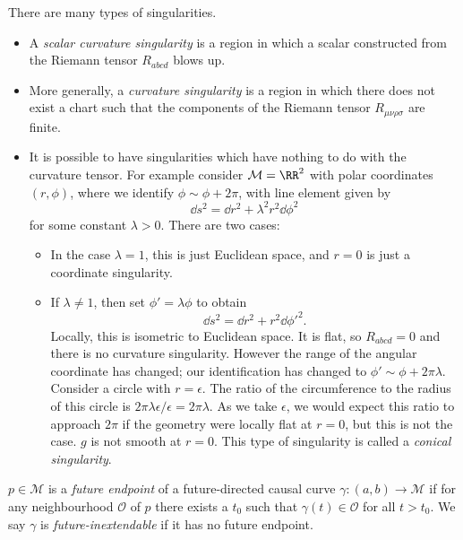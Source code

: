 \documentclass{jknotes}
\begin{document}
There are many types of singularities.
\begin{itemize}
    \item A \emph{scalar curvature singularity} is a region in which a scalar constructed from the Riemann tensor \(R_{abcd}\) blows up.
    \item More generally, a \emph{curvature singularity} is a region in which there does not exist a chart such that the components of the Riemann tensor \(R_{\mu\nu\rho\sigma}\) are finite.
    \item It is possible to have singularities which have nothing to do with the curvature tensor. For example consider \(\mathcal{M}=\RR^2\) with polar coordinates \((r,\phi)\), where we identify \(\phi \sim \phi+2\pi\), with line element given by
        \begin{equation}
            \dd{s}^2=\dd{r}^2+\lambda^2r^2\dd{\phi}^2
        \end{equation}
        for some constant \(\lambda>0\). There are two cases:
        \begin{itemize}
            \item In the case \(\lambda=1\), this is just Euclidean space, and \(r=0\) is just a coordinate singularity.
            \item If \(\lambda\ne1\), then set \(\phi'=\lambda\phi\) to obtain
                \begin{equation}
                    \dd{s}^2 = \dd{r}^2+r^2\dd{\phi'}^2.
                \end{equation}
                Locally, this is isometric to Euclidean space. It is flat, so \(R_{abcd}=0\) and there is no curvature singularity. However the range of the angular coordinate has changed; our identification has changed to \(\phi'\sim\phi+2\pi\lambda\). Consider a circle with \(r=\epsilon\). The ratio of the circumference to the radius of this circle is \(2\pi\lambda\epsilon/\epsilon=2\pi\lambda\). As we take \(\epsilon\), we would expect this ratio to approach \(2\pi\) if the geometry were locally flat at \(r=0\), but this is not the case. \(g\) is not smooth at \(r=0\). This type of singularity is called a \emph{conical singularity}.
        \end{itemize}
\end{itemize}

\begin{defn}
    \(p\in\mathcal{M}\) is a \emph{future endpoint} of a future-directed causal curve \(\gamma:(a,b)\to\mathcal{M}\) if for any neighbourhood \(\mathcal{O}\) of \(p\) there exists a \(t_0\) such that \(\gamma(t)\in\mathcal{O}\) for all \(t>t_0\). We say \(\gamma\) is \emph{future-inextendable} if it has no future endpoint.
\end{defn}
\end{document}
